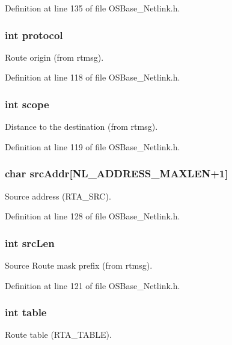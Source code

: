 Definition at line 135 of file OSBase\_\-Netlink.h.\hypertarget{structnl_route_info_ab30e8d7e05ae904d3248e0d51255c005}{
\subsubsection[{protocol}]{\setlength{\rightskip}{0pt plus 5cm}int {\bf protocol}}}
\label{structnl_route_info_ab30e8d7e05ae904d3248e0d51255c005}
Route origin (from rtmsg). 

Definition at line 118 of file OSBase\_\-Netlink.h.\hypertarget{structnl_route_info_ae1af048ea44870cb8acef396ebc4ad09}{
\subsubsection[{scope}]{\setlength{\rightskip}{0pt plus 5cm}int {\bf scope}}}
\label{structnl_route_info_ae1af048ea44870cb8acef396ebc4ad09}
Distance to the destination (from rtmsg). 

Definition at line 119 of file OSBase\_\-Netlink.h.\hypertarget{structnl_route_info_a49c2119e8045d06995653d332271ff8b}{
\subsubsection[{srcAddr}]{\setlength{\rightskip}{0pt plus 5cm}char {\bf srcAddr}\mbox{[}NL\_\-ADDRESS\_\-MAXLEN+1\mbox{]}}}
\label{structnl_route_info_a49c2119e8045d06995653d332271ff8b}
Source address (RTA\_\-SRC). 

Definition at line 128 of file OSBase\_\-Netlink.h.\hypertarget{structnl_route_info_a2b4446e353d9a259ddd348e1bf3de330}{
\subsubsection[{srcLen}]{\setlength{\rightskip}{0pt plus 5cm}int {\bf srcLen}}}
\label{structnl_route_info_a2b4446e353d9a259ddd348e1bf3de330}
Source Route mask prefix (from rtmsg). 

Definition at line 121 of file OSBase\_\-Netlink.h.\hypertarget{structnl_route_info_a381b3daa303e1bdbac3a7b7000e0176c}{
\subsubsection[{table}]{\setlength{\rightskip}{0pt plus 5cm}int {\bf table}}}
\label{structnl_route_info_a381b3daa303e1bdbac3a7b7000e0176c}
Route table (RTA\_\-TABLE). 

